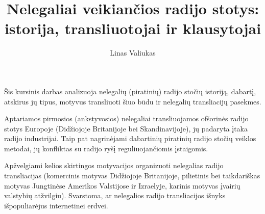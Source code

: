 \documentclass[kursinis-darbas]{vukf}
\begin{document}
	
\title{Nelegaliai veikiančios radijo stotys: istorija, transliuotojai ir klausytojai}
\author{Linas Valiukas}

\maketitle
\tableofcontents


\begin{vukfAbstract}
	

Šis kursinis darbas analizuoja nelegalių (piratinių) radijo stočių istoriją, dabartį, atskirus jų tipus, motyvus transliuoti šiuo būdu ir nelegalių transliacijų pasekmes.

Aptariamos pirmosios (ankstyvosios) nelegaliai transliuojamos ofšorinės radijo stotys Europoje (Didžiojoje Britanijoje bei Skandinavijoje), jų padaryta įtaka radijo industrijai. Taip pat nagrinėjami dabartinių piratinių radijo stočių veiklos metodai, jų konfliktas su radijo ryšį reguliuojančiomis įstaigomis.

Apžvelgiami kelios skirtingos motyvacijos organizuoti nelegalias radijo transliacijas (komercinis motyvas Didžiojoje Britanijoje, pilietinis bei taikdariškas motyvas Jungtinėse Amerikos Valstijose ir Izraelyje, karinis motyvas įvairių valstybių atžvilgiu). Svarstoma, ar nelegalios radijo transliacijos išnyks išpopuliarėjus internetinei erdvei.

\end{vukfAbstract}
\end{document}
